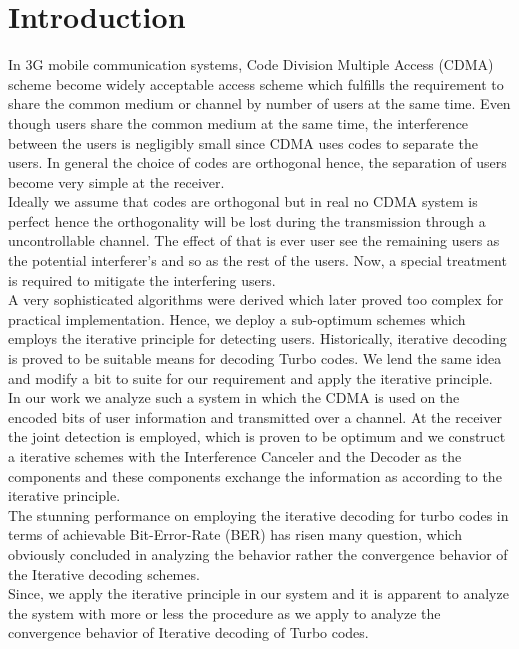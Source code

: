 \chapter{Introduction}
In 3G mobile communication systems, Code Division Multiple Access (CDMA) scheme become widely acceptable access scheme which fulfills the requirement to share the common medium or channel by number of users at the same time. Even though users share the common medium at the same time, the interference between the users is negligibly small since CDMA uses codes to separate the users. In general the choice of codes are orthogonal hence, the separation of users become very simple at the receiver.\\ 

Ideally we assume that codes are orthogonal but in real no CDMA system is perfect hence the orthogonality will be lost during the transmission through a uncontrollable channel. The effect of that is ever user see the remaining users as the potential interferer's and so as the rest of the users. Now, a special treatment is required to mitigate the interfering users. \\  

A very sophisticated algorithms were derived which later proved too complex for practical implementation. Hence, we deploy a sub-optimum schemes which employs the iterative principle for detecting users. Historically, iterative decoding is proved to be suitable means for decoding Turbo codes. We lend the same idea and modify a bit to suite for our requirement and apply the iterative principle. \\ 

In our work we analyze such a system in which the CDMA is used on the encoded bits of user information and transmitted over a channel. At the receiver the joint detection is employed, which is proven to be optimum and we construct a iterative schemes with the Interference Canceler and the Decoder as the components and these components exchange the information as according to the iterative principle. \\ 

The stunning performance on employing the iterative decoding for turbo codes in terms of achievable Bit-Error-Rate (BER) has risen many question, which obviously concluded in analyzing the behavior rather the convergence behavior of the Iterative decoding schemes. \\

Since, we apply the iterative principle in our system and it is apparent to analyze the system with more or less the procedure as we apply to analyze the convergence behavior of Iterative decoding of Turbo codes. \\

